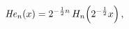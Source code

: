 \[\mathop{\mathit{He}_{n}\/}\nolimits\!\left(x\right)=2^{-\frac{1}{2}n}\mathop{H%
_{n}\/}\nolimits\!\left(2^{-\frac{1}{2}}x\right),\]
